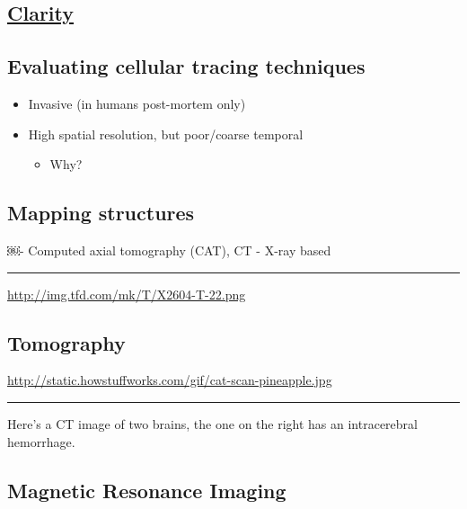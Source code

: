 \documentclass[]{article}
\providecommand{\tightlist}{%
  \setlength{\itemsep}{0pt}\setlength{\parskip}{0pt}}
\begin{document}
\subsection{\texorpdfstring{\href{http://clarityresourcecenter.com/CLARITY.html}{Clarity}}{Clarity}}\label{clarity}

\subsection{Evaluating cellular tracing
techniques}\label{evaluating-cellular-tracing-techniques}

\begin{itemize}
\tightlist
\item
  Invasive (in humans post-mortem only)
\item
  High spatial resolution, but poor/coarse temporal

  \begin{itemize}
  \tightlist
  \item
    Why?
  \end{itemize}
\end{itemize}

\subsection{Mapping structures}\label{mapping-structures-1}

￼- Computed axial tomography (CAT), CT - X-ray based

\begin{center}\rule{0.5\linewidth}{\linethickness}\end{center}

\url{http://img.tfd.com/mk/T/X2604-T-22.png}

\subsection{Tomography}\label{tomography}

\url{http://static.howstuffworks.com/gif/cat-scan-pineapple.jpg}

\begin{center}\rule{0.5\linewidth}{\linethickness}\end{center}

Here's a CT image of two brains, the one on the right has an
intracerebral hemorrhage.

\subsection{Magnetic Resonance
Imaging}\label{magnetic-resonance-imaging}
\end{document}
